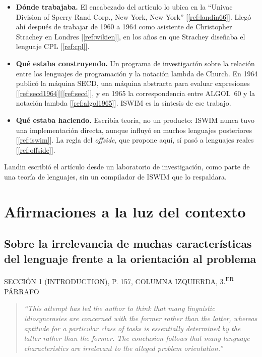 \documentclass[11pt,twoside,openany]{report}
\newcommand{\etiqueta}[1]{{\fontsize{8}{10}\selectfont\addfontfeature{LetterSpace=8}\MakeUppercase{#1}}}
\newcommand{\fuente}[1]{{\color{acento}[\ref{#1}]}}
\begin{document}
\begin{itemize}
  \item \textbf{Dónde trabajaba.} El encabezado del artículo lo ubica en la ``Univac Division of Sperry Rand Corp., New York, New York'' \fuente{ref:landin66}. Llegó ahí después de trabajar de 1960 a 1964 como asistente de Christopher Strachey en Londres \fuente{ref:wikien}, en los años en que Strachey diseñaba el lenguaje CPL \fuente{ref:cpl}.
  \item \textbf{Qué estaba construyendo.} Un programa de investigación sobre la relación entre los lenguajes de programación y la notación lambda de Church. En 1964 publicó la máquina SECD, una máquina abstracta para evaluar expresiones \fuente{ref:secd1964}\fuente{ref:secd}, y en 1965 la correspondencia entre ALGOL~60 y la notación lambda \fuente{ref:algol1965}. ISWIM es la síntesis de ese trabajo.
  \item \textbf{Qué estaba haciendo.} Escribía teoría, no un producto: ISWIM nunca tuvo una implementación directa, aunque influyó en muchos lenguajes posteriores \fuente{ref:iswim}. La regla del \emph{offside}, que propone aquí, sí pasó a lenguajes reales \fuente{ref:offside}.
\end{itemize}

\begin{destacado}
Landin escribió el artículo desde un laboratorio de investigación, como parte de una teoría de lenguajes, sin un compilador de ISWIM que lo respaldara.
\end{destacado}

\section{Afirmaciones a la luz del contexto}

\subsection{Sobre la irrelevancia de muchas características del lenguaje frente a la orientación al problema}

\etiqueta{Sección 1 (Introduction), p. 157, columna izquierda, 3.\textsuperscript{er} párrafo}
\begin{quote}\itshape\sloppy ``This attempt has led the author to think that many linguistic idiosyncrasies are concerned with the former rather than the latter, whereas aptitude for a particular class of tasks is essentially determined by the latter rather than the former. The conclusion follows that many language characteristics are irrelevant to the alleged problem orientation.''\end{quote}
\end{document}
